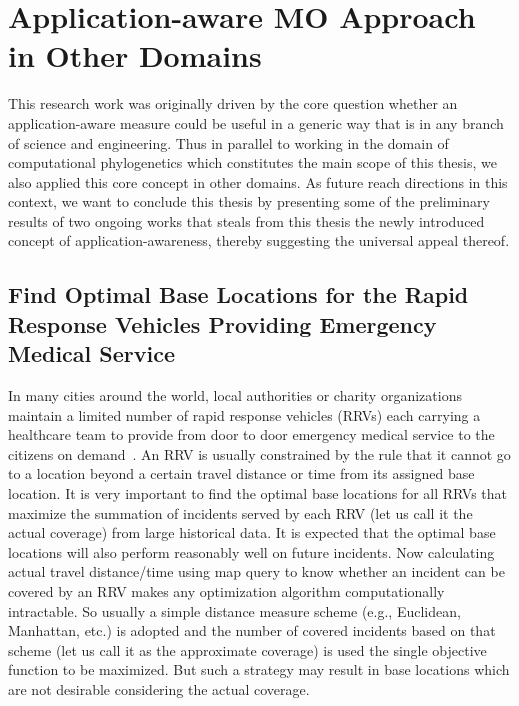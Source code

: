 \section{Application-aware MO Approach in Other Domains}
This research work was originally driven by the core question whether an application-aware measure could be useful in a generic way that is in any branch of science and engineering. Thus in parallel to working in the domain of computational phylogenetics which constitutes the main scope of this thesis, we also applied this core concept in other domains. As future reach directions in this context, we want to conclude this thesis by presenting some of the preliminary results of two ongoing works that steals from this thesis the newly introduced concept of application-awareness, thereby suggesting the universal appeal thereof.

\subsection{Find Optimal Base Locations for the Rapid Response Vehicles Providing Emergency Medical Service}
In many cities around the world, local authorities or charity organizations maintain a limited number of rapid response vehicles (RRVs) each carrying a healthcare team to provide from door to door emergency medical service to the citizens on demand~\cite{roislien2018comparing, van2019improving, benabdouallah2017comparison}. An RRV is usually constrained by the rule that it cannot go to a location beyond a certain travel distance or time from its assigned base location. It is very important to find the optimal base locations for all RRVs that maximize the summation of incidents served by each RRV (let us call it the actual coverage) from large historical data. It is expected that the optimal base locations will also perform reasonably well on future incidents. Now calculating actual travel distance/time using map query to know whether an incident can be covered by an RRV makes any optimization algorithm computationally intractable. So usually a simple distance measure scheme (e.g., Euclidean, Manhattan, etc.) is adopted and the number of covered incidents based on that scheme (let us call it as the approximate coverage) is used the single objective function to be maximized. But such a strategy may result in base locations which are not desirable considering the actual coverage.

